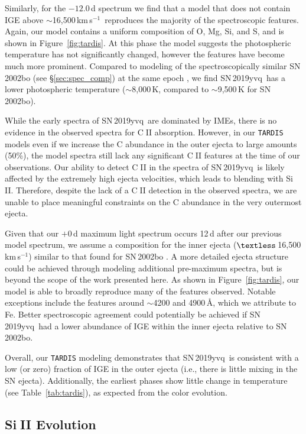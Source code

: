 \documentclass[twocolumn]{aastex63}
\def\ion#1#2{#1$\;${\footnotesize\rm{#2}}\relax}
\newcommand{\kms}{km\,s$^{-1}$}
\newcommand{\sn}{SN\,2019yvq}
\begin{document}
Similarly, for the $-12.0$\,d spectrum we find that a model that does not
contain IGE above $\sim$16,500\,\kms\ reproduces the majority of the
spectroscopic features. Again, our model contains a uniform composition of O,
Mg, Si, and S, and is shown in Figure~\ref{fig:tardis}. At this phase the model
suggests the photospheric temperature has not significantly changed, however
the features have become much more prominent. Compared to modeling of the
spectroscopically similar SN\,2002bo (see \S\ref{sec:spec_comp}) at the same
epoch \citep{Stehle05}, we find \sn\ has a lower photospheric temperature
($\sim$8,000\,K, compared to $\sim$9,500\,K for SN\,2002bo).

While the early spectra of \sn\ are dominated by IMEs, there is no evidence in
the observed spectra for \ion{C}{II} absorption. However, in our
\texttt{TARDIS} models even if we increase the C abundance in the outer ejecta
to large amounts (50\%), the model spectra still lack any significant
\ion{C}{II} features at the time of our observations. Our ability to detect
\ion{C}{II} in the spectra of \sn\ is likely affected by the extremely high
ejecta velocities, which leads to blending with \ion{Si}{II}. Therefore,
despite the lack of a \ion{C}{II} detection in the observed spectra, we are
unable to place meaningful constraints on the C abundance in the very
outermost ejecta.

Given that our $+0$\,d maximum light spectrum occurs 12\,d after our previous
model spectrum, we assume a composition for the inner ejecta
($\textless$\,16,500\,\kms) similar to that found for SN\,2002bo
\citep{Stehle05}. A more detailed ejecta structure could be achieved through
modeling additional pre-maximum spectra, but is beyond the scope of the work
presented here. As shown in Figure~\ref{fig:tardis}, our model is able to
broadly reproduce many of the features observed. Notable exceptions include
the features around $\sim$4200 and 4900\,\AA, which we attribute to Fe. Better
spectroscopic agreement could potentially be achieved if \sn\ had a lower
abundance of IGE within the inner ejecta relative to SN\,2002bo.

Overall, our \texttt{TARDIS} modeling demonstrates that \sn\ is consistent
with a low (or zero) fraction of IGE in the outer ejecta (i.e., there is
little mixing in the SN ejecta). Additionally, the earliest phases show little
change in temperature (see Table~\ref{tab:tardis}), as expected from the color
evolution.

\subsection{\ion{Si}{II} Evolution}\label{sec:SiII}
\end{document}
